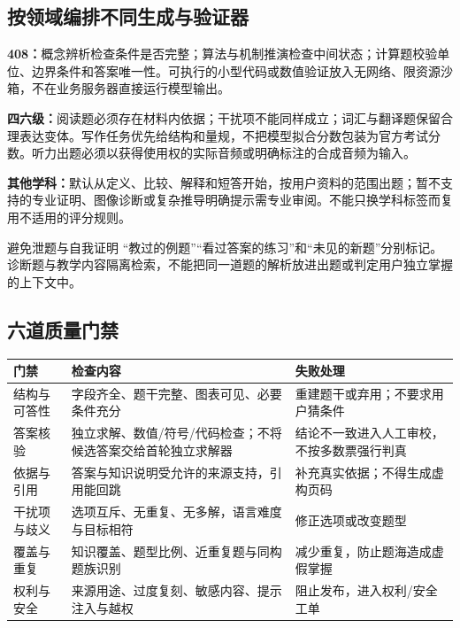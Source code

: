 \documentclass[UTF8,a4paper,11pt,fontset=none]{ctexart}
\newcommand{\cth}[1]{\textbf{\sffamily #1}}
\newcommand{\cont}[1]{\clearpage\noindent{\small\sffamily\color{Muted}#1}\par\vspace{3pt}}
\newenvironment{tbl}{\par\vspace{3pt}\small\noindent\ignorespaces}{\unskip\par\vspace{5pt}}
\begin{document}
\subsection{按领域编排不同生成与验证器}
\textbf{408：}概念辨析检查条件是否完整；算法与机制推演检查中间状态；计算题校验单位、边界条件和答案唯一性。可执行的小型代码或数值验证放入无网络、限资源沙箱，不在业务服务器直接运行模型输出。

\textbf{四六级：}阅读题必须存在材料内依据；干扰项不能同样成立；词汇与翻译题保留合理表达变体。写作任务优先给结构和量规，不把模型拟合分数包装为官方考试分数。听力出题必须以获得使用权的实际音频或明确标注的合成音频为输入。

\textbf{其他学科：}默认从定义、比较、解释和短答开始，按用户资料的范围出题；暂不支持的专业证明、图像诊断或复杂推导明确提示需专业审阅。不能只换学科标签而复用不适用的评分规则。

\begin{insight}{避免泄题与自我证明}
“教过的例题”“看过答案的练习”和“未见的新题”分别标记。诊断题与教学内容隔离检索，不能把同一道题的解析放进出题或判定用户独立掌握的上下文中。
\end{insight}

\cont{10 / 习题生成与质量控制（续）}
\subsection{六道质量门禁}
\begin{tbl}
\begin{tabularx}{\linewidth}{@{}L{25mm}YY@{}}
\toprule
\cth{门禁}&\cth{检查内容}&\cth{失败处理}\\\midrule
结构与可答性&字段齐全、题干完整、图表可见、必要条件充分&重建题干或弃用；不要求用户猜条件\\
答案核验&独立求解、数值/符号/代码检查；不将候选答案交给首轮独立求解器&结论不一致进入人工审校，不按多数票强行判真\\
依据与引用&答案与知识说明受允许的来源支持，引用能回跳&补充真实依据；不得生成虚构页码\\
干扰项与歧义&选项互斥、无重复、无多解，语言难度与目标相符&修正选项或改变题型\\
覆盖与重复&知识覆盖、题型比例、近重复题与同构题族识别&减少重复，防止题海造成虚假掌握\\
权利与安全&来源用途、过度复刻、敏感内容、提示注入与越权&阻止发布，进入权利/安全工单\\
\bottomrule
\end{tabularx}
\end{tbl}
\end{document}
